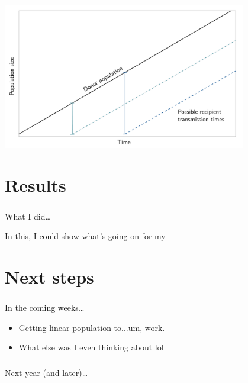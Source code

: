 \documentclass[aspectratio=169]{beamer}
\begin{document}
\begin{frame} \frametitle{\insertsection}

    \centering\includegraphics[width=0.8\textwidth]{images/linear-time-location}

\end{frame}

\section{Results}

\begin{frame} \frametitle{\insertsection}

    What I did\ldots

    In this, I could show what's going on for my 

\end{frame}

\section{Next steps}

\begin{frame} \frametitle{\insertsection}

    In the coming weeks\ldots

    \begin{itemize}
        \item{Getting linear population to...um, work.}
        \item{What else was I even thinking about lol}
    \end{itemize}

\end{frame}

\begin{frame} \frametitle{\insertsection}

    Next year (and later)\ldots

\end{frame}
\end{document}
